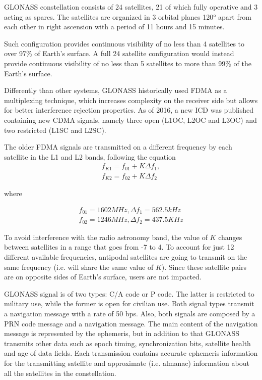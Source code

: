 \vspace{\baselineskip}

GLONASS constellation consists of 24 satellites, 21 of which fully operative and
3 acting as spares. The satellites are organized in 3 orbital planes \ang{120}
apart from each other in right ascension with a period of 11 hours and 15
minutes.

Such configuration provides continuous visibility of no less than 4 satellites
to over 97\% of Earth's surface. A full 24 satellite configuration would instead
provide continuous visibility of no less than 5 satellites to more than 99\% of
the Earth's surface.

\vspace{\baselineskip}

Differently than other systems, GLONASS historically used FDMA as a multiplexing
technique, which increases complexity on the receiver side but allows for better
interference rejection properties. As of 2016, a new ICD was published
containing new CDMA signals, namely three open (L1OC, L2OC and L3OC) and two
restricted (L1SC and L2SC).

The older FDMA signals are transmitted on a different frequency by each
satellite in the L1 and L2 bands, following the equation
\begin{equation}
  \begin{array}{l}
    f_{K1} = f_{01} + K \Delta f_1, \\
    f_{K2} = f_{02} + K \Delta f_2
  \end{array}
\end{equation}

where

\begin{equation}
  \begin{array}{l}
    f_{01} = 1602 MHz, \Delta f_1 = 562.5 kHz \\
    f_{02} = 1246 MHz, \Delta f_2 = 437.5 KHz
  \end{array}
\end{equation}

To avoid interference with the radio astronomy band, the value of $K$ changes
between satellites in a range that goes from -7 to 4. To account for just 12
different available frequencies, antipodal satellites are going to transmit on
the same frequency (i.e. will share the same value of $K$). Since these
satellite pairs are on opposite sides of Earth's surface, users are not
impacted.

GLONASS signal is of two types: C/A code or P code. The latter is restricted to
military use, while the former is open for civilian use. Both signal types
transmit a navigation message with a rate of 50 bps. Also, both signals are
composed by a PRN code message and a navigation message. The main content of the
navigation message is represented by the ephemeris, but in addition to that
GLONASS transmits other data such as epoch timing, synchronization bits,
satellite health and age of data fields. Each transmission contains accurate
ephemeris information for the transmitting satellite and approximate (i.e.
almanac) information about all the satellites in the constellation.

